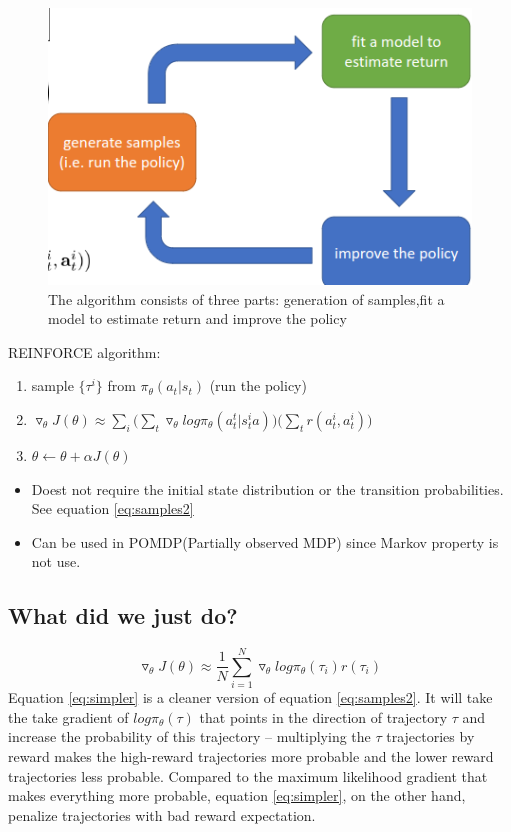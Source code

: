 \documentclass[]{article}
\begin{document}
\begin{figure}
\begin{center}
    \includegraphics[scale=0.5]{cap4img/algorithm.png}
\end{center}
\caption{The algorithm consists of three parts: generation of samples,fit a model to estimate return and improve the
policy}
\label{fig:}
\end{figure}

REINFORCE algorithm:
\begin{enumerate}
    \item sample $\{\tau^{i}\}$ from $\pi_{\theta}(a_t|s_t)$ (run the policy)
    \item $\triangledown_{\theta}J(\theta) \approx
        \sum_{i}\big(\sum_{t}\triangledown_{\theta}log\pi_{\theta}(a_{t}^{t}|s_{t}^{i}a)\big)\big(\sum_{t}r(a_{t}^{i},a_{t}^{i})\big)$
    \item $ \theta \leftarrow \theta + \alpha J(\theta)$
\end{enumerate}
\begin{itemize}
    \item Doest not require the  initial state distribution or the transition probabilities. See equation \eqref{eq:samples2}
    \item Can be used in POMDP(Partially observed MDP) since Markov property is not use.
\end{itemize}


\subsection*{What did we just do?}%
\label{sub:What did we just do?}

\begin{equation}
    \label{eq:simpler}
    \triangledown_{\theta}J(\theta) \approx \frac{1}{N}\sum_{i=1}^{N}\triangledown_{\theta} log\pi_{\theta}(\tau_{i})
    r(\tau_{i})
\end{equation}
Equation \eqref{eq:simpler} is a cleaner version of equation \eqref{eq:samples2}.  It will take the take gradient of
$log\pi_{\theta}(\tau)$ that  points in the direction of trajectory $\tau$ and increase the probability of this
trajectory -- multiplying the $\tau$ trajectories by reward makes the high-reward trajectories more probable and the
lower reward trajectories less probable. Compared to the maximum likelihood gradient that makes everything more probable,
equation \eqref{eq:simpler}, on the other hand, penalize trajectories with bad reward expectation.
\end{document}
